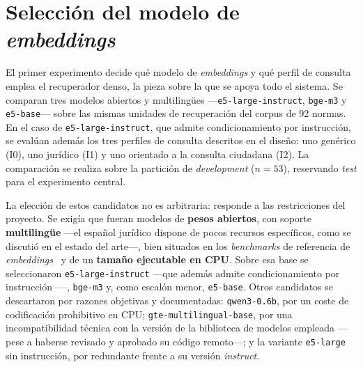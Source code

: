 \section{Selección del modelo de \emph{embeddings}}
\label{sec:seleccion-embeddings}

El primer experimento decide qué modelo de \emph{embeddings} y qué perfil de consulta emplea el recuperador denso, la pieza sobre la que se apoya todo el sistema. Se comparan tres modelos abiertos y multilingües —\texttt{e5-large-instruct}, \texttt{bge-m3} y \texttt{e5-base}— sobre las mismas unidades de recuperación del corpus de 92 normas. En el caso de \texttt{e5-large-instruct}, que admite condicionamiento por instrucción, se evalúan además los tres perfiles de consulta descritos en el diseño: uno genérico (I0), uno jurídico (I1) y uno orientado a la consulta ciudadana (I2). La comparación se realiza sobre la partición de \emph{development} ($n=53$), reservando \emph{test} para el experimento central.

La elección de estos candidatos no es arbitraria: responde a las restricciones del proyecto. Se exigía que fueran modelos de \textbf{pesos abiertos}, con soporte \textbf{multilingüe} —el español jurídico dispone de pocos recursos específicos, como se discutió en el estado del arte—, bien situados en los \emph{benchmarks} de referencia de \emph{embeddings}~\cite{muennighoff2023mteb} y de un \textbf{tamaño ejecutable en CPU}. Sobre esa base se seleccionaron \texttt{e5-large-instruct} —que además admite condicionamiento por instrucción~\cite{su2023instructor}—, \texttt{bge-m3} y, como escalón menor, \texttt{e5-base}. Otros candidatos se descartaron por razones objetivas y documentadas: \texttt{qwen3-0.6b}, por un coste de codificación prohibitivo en CPU; \texttt{gte-multilingual-base}, por una incompatibilidad técnica con la versión de la biblioteca de modelos empleada —pese a haberse revisado y aprobado su código remoto—; y la variante \texttt{e5-large} sin instrucción, por redundante frente a su versión \emph{instruct}.

